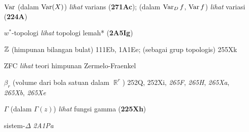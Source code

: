 \indexmedskip
{}

$\mathop{\text{Var}}$ (dalam $\mathop{\text{Var}}(X)$) {\it lihat} varians ({\bf 271Ac});
  (dalam $\mathop{\text{Var}}_Df$, $\mathop{\text{Var}} f$) {\it lihat} variasi ({\bf 224A})




\indexmedskip
{}



$w^*$-topologi {\it lihat} topologi lemah* ({\bf 2A5Ig})











\indexmedskip
{}

$\Bbb Z$ (himpunan bilangan bulat) 111Eb, 1A1Ee;
  (sebagai grup topologis) 255Xk
  







ZFC {\it lihat} teori himpunan Zermelo-Fraenkel

 



\indexmedskip\indexheader{$\scriptstyle\pmb{\beta}$} 

$\beta_r$ (volume dari bola satuan dalam $\BbbR^r$) 252Q, 252Xi,
{\it 265F}, {\it 265H}, {\it 265Xa}, {\it 265Xb}, {\it 265Xe}





\indexmedskip\indexheader{$\scriptstyle\pmb{\Gamma}$} 

$\Gamma$ (dalam $\Gamma(z)$) {\it lihat} fungsi gamma ({\bf 225Xh})



\indexmedskip\indexheader{$\scriptstyle\pmb{\Delta}$}





sistem-$\Delta$ {\it 2A1Pa}



















\indexmedskip\indexheader{$\scriptstyle\pmb{\lambda}$}



